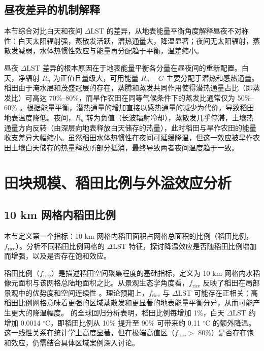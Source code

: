 \subsection{昼夜差异的机制解释}

本节综合对比白天和夜间 $\Delta$LST 的差异，从地表能量平衡角度解释昼夜不对称性：白天太阳辐射强，蒸散发活跃，潜热通量大，降温显著；夜间无太阳辐射，蒸散发减弱，水体热惯性效应与能量再分配趋于平衡，温差缩小。

昼夜 $\Delta$LST 差异的根本原因在于地表能量平衡各分量在昼夜间的重新配置。白天，净辐射 $R_n$ 为正值且量级大，可用能量 $R_n - G$ 主要分配于潜热和感热通量。稻田由于淹水层和茂盛冠层的存在，蒸腾和蒸发共同作用使得潜热通量占比（即蒸发比）可高达 70\%--80\%，而旱作农田在同等气候条件下的蒸发比通常仅为 50\%--60\% \cite{Weng2025}。根据能量平衡，潜热通量的增加直接以感热通量的减少为代价，导致稻田地表温度降低。夜间，$R_n$ 转为负值（长波辐射冷却），蒸散发几乎停滞，土壤热通量方向反转（由深层向地表释放白天储存的热量），此时稻田与旱作农田的能量收支差异大幅缩小。虽然稻田水体热惯性在夜间可延缓降温，但这一效应被旱作农田土壤白天储存的热量释放所部分抵消，最终导致两者夜间温度趋于一致。

\section{田块规模、稻田比例与外溢效应分析}

\subsection{10 km 网格内稻田比例}

本节定义第一个指标：10 km 网格内稻田面积占网格总面积的比例（稻田比例，$f_{\text{rice}}$）。分析不同稻田比例网格的 $\Delta$LST 特征，探讨降温效应是否随稻田比例增加而增强，以及是否存在饱和效应。

稻田比例（$f_{\text{rice}}$）是描述稻田空间聚集程度的基础指标，定义为 10 km 网格内水稻像元面积与该网格总陆地面积之比。从景观生态学角度看，$f_{\text{rice}}$ 反映了稻田在局部景观中的优势度和空间连续性 \cite{Foley2005}。理论预期上，$f_{\text{rice}}$ 与 $\Delta$LST 可能存在正相关：高稻田比例网格意味着更强的区域蒸散发和更显著的地表能量平衡分异，从而可能产生更大的降温幅度。\cite{Weng2025} 的全球回归分析表明，稻田比例每增加 1\%，白天 $\Delta$LST 约增加 0.0014 $^{\circ}\mathrm{C}$，即稻田比例从 10\% 提升至 90\% 可带来约 0.11 $^{\circ}\mathrm{C}$ 的额外降温。这一线性关系在统计学上高度显著，但在极端高值区（$f_{\text{rice}} >$ 80\%）是否存在饱和效应，仍需结合具体区域案例深入讨论。

